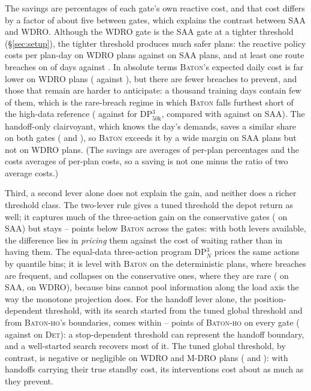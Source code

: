 \documentclass[preprint,authoryear,12pt]{elsarticle}
\theoremstyle{definition}
\theoremstyle{remark}
\begin{document}
The savings are percentages of each gate's own reactive cost, and that
cost differs by a factor of about five between gates, which explains
the contrast between \textsc{SAA} and \textsc{WDRO}. Although the
\textsc{WDRO} gate is the \textsc{SAA} gate at a tighter threshold
(\S\ref{sec:setup}), the tighter threshold produces much safer plans:
the reactive policy costs \reactWDRO{} per plan-day on \textsc{WDRO}
plans against \reactSAA{} on \textsc{SAA} plans, and at least one route
breaches on \pemWDRO{} of days against \pemSAA. In absolute terms
\textsc{Baton}'s expected daily cost is far lower on \textsc{WDRO}
plans (\costWDROBaton{} against \costSAABaton), but there are fewer
breaches to prevent, and those that remain are harder to anticipate: a
thousand training days contain few of them, which is the rare-breach
regime in which \textsc{Baton} falls furthest short of the high-data
reference (\svWDROBaton{} against \svWDRODpThree{} for
DP$^3_{50\mathrm{k}}$, compared with \svSAABaton{} against
\svSAADpThree{} on \textsc{SAA}). The handoff-only clairvoyant, which
knows the day's demands, saves a similar share on both gates
(\svWDROOrc{} and \svSAAOrc), so \textsc{Baton} exceeds it by a wide
margin on \textsc{SAA} plans but not on \textsc{WDRO} plans. (The
savings are averages of per-plan percentages and the costs averages of
per-plan costs, so a saving is not one minus the ratio of two average
costs.)

Third, a second lever alone does not explain the gain, and neither does
a richer threshold class. The two-lever rule gives a tuned threshold the
depot return as well; it captures much of the three-action gain on the
conservative gates (\svSAATwo{} on \textsc{SAA}) but stays
\twoGapLo--\twoGapHi{} points below \textsc{Baton} across the gates:
with both levers available, the difference lies in \emph{pricing} them
against the cost of waiting rather than in having them. The equal-data
three-action program DP$^3_N$ prices the same actions by quantile bins;
it is level with \textsc{Baton} on the deterministic plans, where breaches are
frequent, and collapses on the conservative ones, where they are rare
(\svSAADpThreeN{} on \textsc{SAA}, \svWDRODpThreeN{} on \textsc{WDRO}),
because bins cannot pool information along the load axis the way the
monotone projection does. For the handoff lever alone, the
position-dependent threshold, with its search started from the tuned
global threshold and from \textsc{Baton-ho}'s boundaries, comes within
\thrkHoGapMin--\thrkHoGapMax{} points of \textsc{Baton-ho} on every gate
(\svDetThrK{} against \svDetHo{} on \textsc{Det}): a stop-dependent
threshold can represent the handoff boundary, and a well-started search
recovers most of it. The tuned global threshold, by contrast, is
negative or negligible on \textsc{WDRO} and \textsc{M-DRO} plans
(\svWDROThresh{} and \svMDROThresh{}): with handoffs carrying their true
standby cost, its interventions cost about as much as they prevent.
\end{document}
